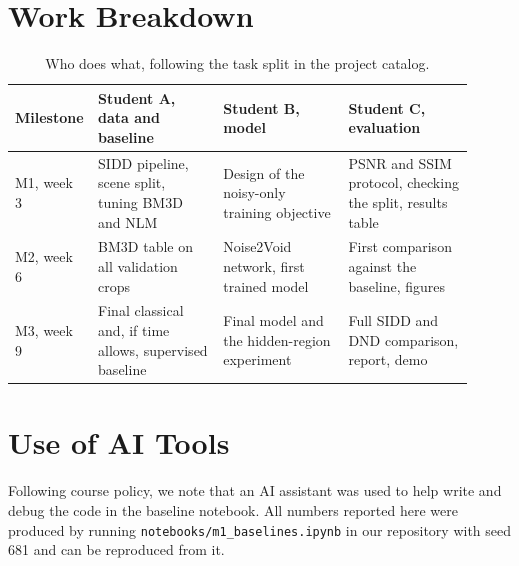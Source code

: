\documentclass[11pt]{article}
\begin{document}
\section{Work Breakdown}
\label{sec:workbreakdown}
\begin{table}[ht]
\centering
\caption{Who does what, following the task split in the project catalog.}
\label{tab:tasks}
\begin{tabular}{@{}p{0.10\linewidth}p{0.27\linewidth}p{0.27\linewidth}p{0.27\linewidth}@{}}
\toprule
\textbf{Milestone} & \textbf{Student A, data and baseline} & \textbf{Student B, model} & \textbf{Student C, evaluation} \\
\midrule
M1, week 3 & SIDD pipeline, scene split, tuning BM3D and NLM & Design of the noisy-only training objective & PSNR and SSIM protocol, checking the split, results table \\
M2, week 6 & BM3D table on all validation crops & Noise2Void network, first trained model & First comparison against the baseline, figures \\
M3, week 9 & Final classical and, if time allows, supervised baseline & Final model and the hidden-region experiment & Full SIDD and DND comparison, report, demo \\
\bottomrule
\end{tabular}
\end{table}



\section*{Use of AI Tools}
Following course policy, we note that an AI assistant was used to help write and debug the
code in the baseline notebook. All numbers reported here were produced by running
\texttt{notebooks/m1\_baselines.ipynb} in our repository with seed 681 and can be
reproduced from it. 



\end{document}
